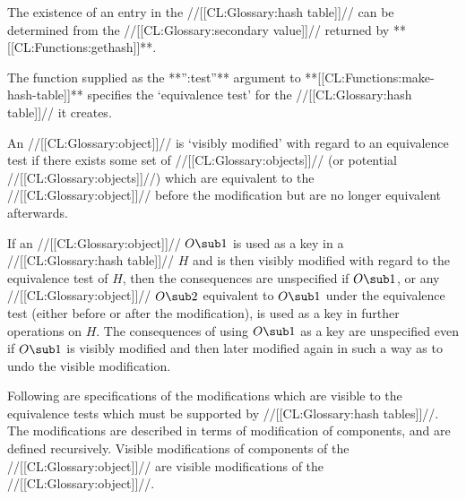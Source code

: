 \itemitem{--}



The existence of an entry in the //[[CL:Glossary:hash table]]// can be determined
from the //[[CL:Glossary:secondary value]]// returned by **[[CL:Functions:gethash]]**.
\endlist               



\endsubsection%



The function supplied as the **'':test''** argument to **[[CL:Functions:make-hash-table]]**
specifies the `equivalence test' for the //[[CL:Glossary:hash table]]// it creates.
 
An //[[CL:Glossary:object]]// is `visibly modified' with regard to an equivalence test
if there exists some set of //[[CL:Glossary:objects]]// (or potential //[[CL:Glossary:objects]]//)
which are equivalent to the //[[CL:Glossary:object]]// before the modification but are
no longer equivalent afterwards.








If an //[[CL:Glossary:object]]// $O\sub 1$ is used as a key in a //[[CL:Glossary:hash table]]// $H$
and is then visibly modified with regard to the equivalence test of $H$,
then the consequences are unspecified if $O\sub 1$, or any //[[CL:Glossary:object]]//
$O\sub 2$ equivalent to $O\sub 1$ under the equivalence test (either before
or after the modification), is used as a key in further operations on $H$.
The consequences of using $O\sub 1$ as a key are unspecified 
even if $O\sub 1$ is visibly modified 
and then later modified again in such a way as 
to undo the visible modification.
 
Following are specifications of the modifications which are visible to the
equivalence tests which must be supported by //[[CL:Glossary:hash tables]]//.  The modifications
are described in terms of modification of components, and are defined
recursively.  Visible modifications of components of the //[[CL:Glossary:object]]// are 
visible modifications of the //[[CL:Glossary:object]]//.


